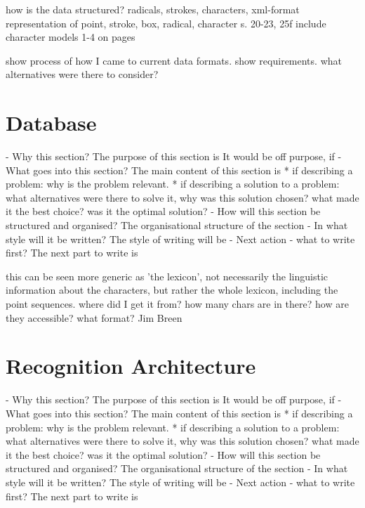 how is the data structured? radicals, strokes, characters, xml-format
representation of point, stroke, box, radical, character
s. 20-23, 25f
include character models 1-4 on pages

show process of how I came to current data formats.
show requirements.
what alternatives were there to consider?


\section{Database}
\label{sec:hwre:database}

- Why this section? 
  The purpose of this section is 
  It would be off purpose, if 
- What goes into this section?
  The main content of this section is 
  * if describing a problem: why is the problem relevant.
  * if describing a solution to a problem: what alternatives were
    there to solve it, why was this solution chosen? 
    what made it the best choice? was it the optimal solution?
- How will this section be structured and organised?
  The organisational structure of the section 
- In what style will it be written?
  The style of writing will be 
- Next action - what to write first?
  The next part to write is


this can be seen more generic as 'the lexicon', not necessarily
the linguistic information about the characters, but rather the whole
lexicon, including the point sequences.
where did I get it from? how many chars are in there?
how are they accessible? what format?
Jim Breen



\section{Recognition Architecture}
\label{sec:hwre:recognitionarchitecture}

- Why this section? 
  The purpose of this section is 
  It would be off purpose, if 
- What goes into this section?
  The main content of this section is 
  * if describing a problem: why is the problem relevant.
  * if describing a solution to a problem: what alternatives were
    there to solve it, why was this solution chosen? 
    what made it the best choice? was it the optimal solution?
- How will this section be structured and organised?
  The organisational structure of the section 
- In what style will it be written?
  The style of writing will be 
- Next action - what to write first?
  The next part to write is


